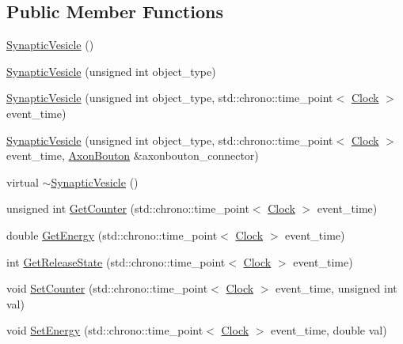 \subsection*{Public Member Functions}
\begin{DoxyCompactItemize}
\item 
\hyperlink{class_synaptic_vesicle_ac3f899ed25281a6d337ecefe1da41c67}{Synaptic\+Vesicle} ()
\item 
\hyperlink{class_synaptic_vesicle_aefd8a743e80077235a1c9a9fd133cc9d}{Synaptic\+Vesicle} (unsigned int object\+\_\+type)
\item 
\hyperlink{class_synaptic_vesicle_a6602b03ba498129b46c173e8fa66927b}{Synaptic\+Vesicle} (unsigned int object\+\_\+type, std\+::chrono\+::time\+\_\+point$<$ \hyperlink{universe_8h_a0ef8d951d1ca5ab3cfaf7ab4c7a6fd80}{Clock} $>$ event\+\_\+time)
\item 
\hyperlink{class_synaptic_vesicle_a0f86278b771137978d03bb6cf460a527}{Synaptic\+Vesicle} (unsigned int object\+\_\+type, std\+::chrono\+::time\+\_\+point$<$ \hyperlink{universe_8h_a0ef8d951d1ca5ab3cfaf7ab4c7a6fd80}{Clock} $>$ event\+\_\+time, \hyperlink{class_axon_bouton}{Axon\+Bouton} \&axonbouton\+\_\+connector)
\item 
virtual \hyperlink{class_synaptic_vesicle_a9bbc23a1c9757d8522a10bb28e0f575b}{$\sim$\+Synaptic\+Vesicle} ()
\item 
unsigned int \hyperlink{class_synaptic_vesicle_a42a3ab6704c27ca55531864c46f0fc2b}{Get\+Counter} (std\+::chrono\+::time\+\_\+point$<$ \hyperlink{universe_8h_a0ef8d951d1ca5ab3cfaf7ab4c7a6fd80}{Clock} $>$ event\+\_\+time)
\item 
double \hyperlink{class_synaptic_vesicle_a0c4d7e936023cf0f719d0a4d3f315c9c}{Get\+Energy} (std\+::chrono\+::time\+\_\+point$<$ \hyperlink{universe_8h_a0ef8d951d1ca5ab3cfaf7ab4c7a6fd80}{Clock} $>$ event\+\_\+time)
\item 
int \hyperlink{class_synaptic_vesicle_a6cc0018a0fd02cf99f1ba0ad31f495bc}{Get\+Release\+State} (std\+::chrono\+::time\+\_\+point$<$ \hyperlink{universe_8h_a0ef8d951d1ca5ab3cfaf7ab4c7a6fd80}{Clock} $>$ event\+\_\+time)
\item 
void \hyperlink{class_synaptic_vesicle_a7fd7cfce5eccb904206d968866f85220}{Set\+Counter} (std\+::chrono\+::time\+\_\+point$<$ \hyperlink{universe_8h_a0ef8d951d1ca5ab3cfaf7ab4c7a6fd80}{Clock} $>$ event\+\_\+time, unsigned int val)
\item 
void \hyperlink{class_synaptic_vesicle_ac98f9c8ccaabbccc38151c51d204dfec}{Set\+Energy} (std\+::chrono\+::time\+\_\+point$<$ \hyperlink{universe_8h_a0ef8d951d1ca5ab3cfaf7ab4c7a6fd80}{Clock} $>$ event\+\_\+time, double val)

\end{DoxyCompactItemize}
